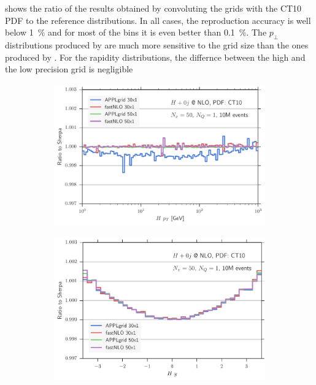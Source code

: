  shows the ratio of the results obtained by convoluting the grids with the CT10 PDF to the reference distributions.
In all cases, the reproduction accuracy is well below \SI{1}{\percent} and for most of the bins it is even better than \SI{0.1}{\percent}.
The $p_\perp$ distributions produced by \appl{} are much more sensitive to the grid size than the ones produced by \fnlo{}.
For the rapidity distributions, the differnce between the high and the low precision grid is negligible
%
\begin{figure}
\centering
\begin{subfigure}[]{0.49\textwidth}
	\includegraphics[width=\textwidth]{images/hnlo_hpt_50v30.pdf}
\end{subfigure}
\hfill
\begin{subfigure}[]{0.49\textwidth}
	\includegraphics[width=\textwidth]{images/hnlo_hy_50v30.pdf}
\end{subfigure}


\end{figure}
